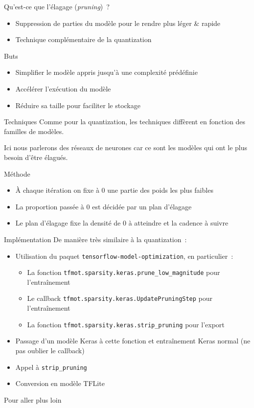 \begin{frame}{Qu'est-ce que l'élagage (\textit{pruning})~?}
  \begin{itemize}
    \item Suppression de parties du modèle pour le rendre plus léger \& rapide
    \item Technique complémentaire de la quantization
  \end{itemize}
\end{frame}

\begin{frame}{Buts}
  \begin{itemize}
    \item Simplifier le modèle appris jusqu'à une complexité prédéfinie
    \item Accélérer l'exécution du modèle
    \item Réduire sa taille pour faciliter le stockage
  \end{itemize}
\end{frame}

\begin{frame}{Techniques}
  Comme pour la quantization, les techniques diffèrent en fonction des familles de modèles.

  Ici nous parlerons des réseaux de neurones car ce sont les modèles
qui ont le plus besoin d’être élagués.
\end{frame}

\begin{frame}{Méthode}
  \begin{itemize}
    \item À chaque itération on fixe à 0 une partie des poids les plus faibles
    \item La proportion passée à 0 est décidée par un plan d'élagage
    \item Le plan d'élagage fixe la densité de 0 à atteindre et la cadence à suivre
  \end{itemize}
\end{frame}

\begin{frame}{Implémentation}
  De manière très similaire à la quantization~:
  \begin{itemize}
    \item Utilisation du paquet \texttt{tensorflow-model-optimization}, en particulier~:
      \begin{itemize}
        \item La fonction \texttt{tfmot.sparsity.keras.prune\_low\_magnitude} pour l'entraînement
        \item Le callback \texttt{tfmot.sparsity.keras.UpdatePruningStep} pour l'entraînement
        \item La fonction \texttt{tfmot.sparsity.keras.strip\_pruning} pour l'export
      \end{itemize}
    \item Passage d'un modèle Keras à cette fonction et entraînement Keras normal (ne pas oublier le callback)
    \item Appel à \texttt{strip\_pruning}
    \item Conversion en modèle TFLite
  \end{itemize}
\end{frame}

\begin{frame}{Pour aller plus loin}
\end{frame}